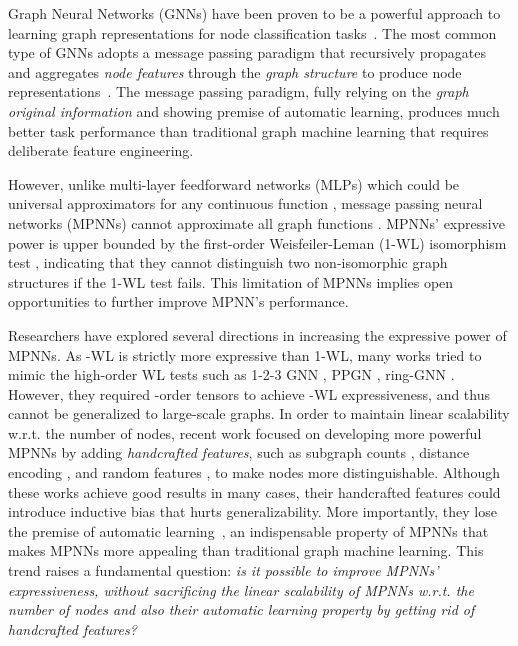 \documentclass{article}
\theoremstyle{plain}
\begin{document}
Graph Neural Networks (GNNs) have been proven to be a powerful approach to learning graph representations for node classification tasks~\cite{hamilton2017inductive,klicpera2018predict,wu2019simplifying}.
The most common type of GNNs adopts a message passing paradigm that recursively propagates and aggregates \textit{node features} through the \textit{graph structure} to produce node representations~\cite{gilmer2017neural,battaglia2018relational}. 
The message passing paradigm, fully relying on the \textit{graph original information} and showing premise of automatic learning, produces much better task performance than traditional graph machine learning that requires deliberate feature engineering. 


However, unlike multi-layer feedforward networks (MLPs) which could be universal approximators for any continuous function \cite{hornik1989multilayer}, message passing neural networks (MPNNs) cannot approximate all graph functions \cite{maron2018invariant}. 
MPNNs' expressive power is upper bounded by the first-order Weisfeiler-Leman (1-WL) isomorphism test \cite{xu2018powerful}, indicating that they cannot distinguish two non-isomorphic graph structures if the 1-WL test fails. 
This limitation of MPNNs implies open opportunities to further improve MPNN's performance.  


Researchers have explored several directions in increasing the expressive power of MPNNs. 
As -WL is strictly more expressive than 1-WL, many works tried to mimic the high-order WL tests such as 1-2-3 GNN \cite{morris2019weisfeiler}, PPGN \cite{maron2019provably}, ring-GNN \cite{chen2019equivalence}.
However, they required -order tensors to achieve -WL expressiveness, and thus cannot be generalized to large-scale graphs. 
In order to maintain linear scalability w.r.t. the number of nodes, recent work focused on developing more powerful MPNNs by adding \textit{handcrafted features}, such as subgraph counts \cite{bouritsas2022improving}, distance encoding \cite{li2020distance}, and random features \cite{abboud2020surprising,sato2021random}, to make nodes more distinguishable. 
Although these works achieve good results in many cases, their handcrafted features could introduce inductive bias that hurts generalizability. 
More importantly, they lose the premise of automatic learning~\cite{zhao2021stars}, 
an indispensable property of MPNNs that makes MPNNs more appealing than traditional graph machine learning. 
This trend raises a fundamental question: \textit{is it possible to improve MPNNs' expressiveness, without sacrificing the linear scalability of MPNNs w.r.t. the number of nodes and also their automatic learning property by getting rid of handcrafted features?}
\end{document}
